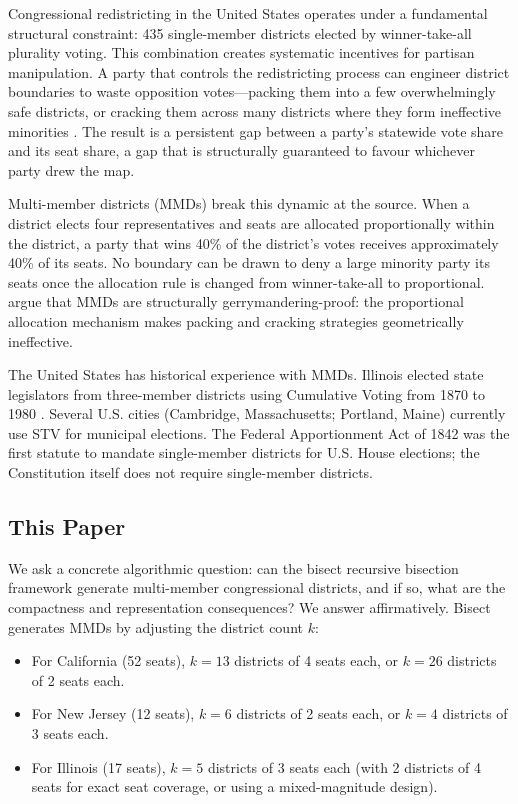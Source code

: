 Congressional redistricting in the United States operates under a fundamental
structural constraint: 435 single-member districts elected by winner-take-all
plurality voting.  This combination creates systematic incentives for partisan
manipulation.  A party that controls the redistricting process can engineer
district boundaries to waste opposition votes---packing them into a few
overwhelmingly safe districts, or cracking them across many districts where
they form ineffective minorities \citep{stephanopoulos2015partisan}.  The
result is a persistent gap between a party's statewide vote share and its seat
share, a gap that is structurally guaranteed to favour whichever party drew
the map.

Multi-member districts (MMDs) break this dynamic at the source.  When a
district elects four representatives and seats are allocated proportionally
within the district, a party that wins 40\% of the district's votes receives
approximately 40\% of its seats.  No boundary can be drawn to deny a large
minority party its seats once the allocation rule is changed from
winner-take-all to proportional.  \citet{mcgann2016gerrymandering} argue that
MMDs are structurally gerrymandering-proof: the proportional allocation
mechanism makes packing and cracking strategies geometrically ineffective.

The United States has historical experience with MMDs.  Illinois elected
state legislators from three-member districts using Cumulative Voting from
1870 to 1980 \citep{cole2001cumulative}.  Several U.S. cities (Cambridge,
Massachusetts; Portland, Maine) currently use STV for municipal elections.
The Federal Apportionment Act of 1842 was the first statute to mandate
single-member districts for U.S. House elections; the Constitution itself
does not require single-member districts.

\subsection{This Paper}

We ask a concrete algorithmic question: can the bisect recursive bisection
framework generate multi-member congressional districts, and if so, what are
the compactness and representation consequences?  We answer affirmatively.
Bisect generates MMDs by adjusting the district count $k$:
\begin{itemize}
  \item For California (52 seats), $k = 13$ districts of 4 seats each, or
        $k = 26$ districts of 2 seats each.
  \item For New Jersey (12 seats), $k = 6$ districts of 2 seats each, or
        $k = 4$ districts of 3 seats each.
  \item For Illinois (17 seats), $k = 5$ districts of 3 seats each
        (with 2 districts of 4 seats for exact seat coverage, or using a
        mixed-magnitude design).
\end{itemize}

